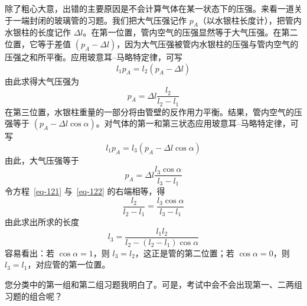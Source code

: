 \begin{dialogue}
\tchr 除了粗心大意，出错的主要原因是不会计算气体在某一状态下的压强。来看一道关于一端封闭的玻璃管的习题。我们把大气压强记作 $p_{A}$（以水银柱长度计），把管内水银柱的长度记作 $\Delta l$。在第一位置，管内空气的压强显然等于大气压强。在第二位置，它等于差值 $(p_{A}-\Delta l)$，因为大气压强被管内水银柱的压强与管内空气的压强之和所平衡。应用玻意耳--马略特定律，可写
\begin{equation*}%
l_{1} p_{A} = l_{2} (p_{A} -\Delta l)
\end{equation*}
由此求得大气压强为
\begin{equation}%
p_{A} = \Delta l \frac{l_{2}}{l_{2} - l_{1}}
\label{eq-121}
\end{equation}
在第三位置，水银柱重量的一部分将由管壁的反作用力平衡。结果，管内空气的压强等于 $(p_{A}-\Delta l \cos \alpha)$。对气体的第一和第三状态应用玻意耳--马略特定律，可写
\begin{equation*}%
l_{1} p_{A} = l_{3} (p_{A} -\Delta l \cos \alpha)
\end{equation*}
由此，大气压强等于
\begin{equation}%
p_{A} = \Delta l \frac{l_{3} \cos \alpha}{l_{3} - l_{1}}
\label{eq-122}
\end{equation}
令方程~\eqref{eq-121} 与~\eqref{eq-122} 的右端相等，得
\begin{equation*}%
\frac{l_{2}}{l_{2} - l_{1}} = \frac{l_{3} \cos \alpha}{l_{3} - l_{1}}
\end{equation*}
由此求出所求的长度
\begin{equation}%
l_{3}  = \frac{l_{1} l_{2}}{l_{2} -(l_{2} -  l_{1})\cos \alpha}
\label{eq-123}
\end{equation}
容易看出：若 $\cos \alpha =1$，则 $l_{3}  = l_{2}$，这正是管的第二位置；若 $\cos \alpha =0$，则 $l_{3}  = l_{1}$，对应管的第一位置。

\stda 您分类中的第一组和第二组习题我明白了。可是，考试中会不会出现第一、二两组习题的组合呢？


\end{dialogue}

